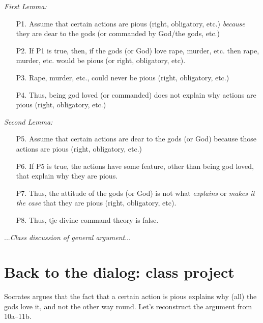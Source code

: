 \documentclass[oneside]{article}
\begin{document}
\noindent \emph{First Lemma:}

\begin{enumerate}
\item[P1.] Assume that certain actions are pious (right,  obligatory, etc.) \emph{because} they are dear to the gods (or commanded by God/the gods, etc.)
\item[P2.] If P1 is true, then, if the gods (or God) love rape, murder, etc. then rape, murder, etc. would be pious (or right, obligatory, etc). 
\item[P3.] Rape, murder, etc., could never be pious (right, obligatory, etc.) 
\item[P4.] Thus, being god loved (or commanded) does not explain why actions are pious (right, obligatory, etc.)
\end{enumerate}

\noindent \emph{Second Lemma:}
\begin{enumerate}
\item[P5.] Assume that certain actions are dear to the gods (or God) because those actions are pious (right, obligatory, etc.)
\item[P6.] If P5 is true, the actions have some feature, other than being god loved, that explain why they are pious. 
\item[P7.] Thus,  the attitude of the gods (or God) is not what \emph{explains} or \emph{makes it the case} that they are pious (right, obligatory, etc).
\item[P8.] Thus, tje divine command theory is false.
\end{enumerate}
\noindent ...\emph{Class discussion of general argument}...

\section*{Back to the dialog: class project}
\noindent Socrates argues that the fact that a certain action is pious explains why (all) the gods love it, and not the other way round. Let's reconstruct the argument from 10a--11b. 

\end{document}
